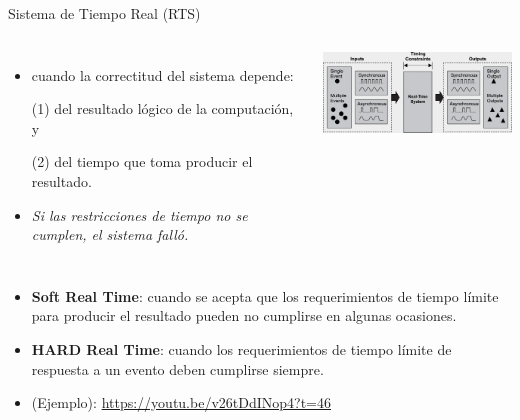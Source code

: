 \documentclass[8pt,aspectratio=169,compress]{beamer}
\begin{document}
\begin{frame}{Sistema de Tiempo Real (RTS)}

   \begin{columns}[onlytextwidth,T]
     \column{\dimexpr\linewidth-70mm-5mm}

	\begin{itemize}
\bigskip
  \item[RTS] cuando la correctitud del sistema depende:

\bigskip
(1) del resultado lógico de la computación, y

\bigskip
(2) del tiempo que toma producir el resultado.

\bigskip
  \item[FALLO] \textit{Si las restricciones de tiempo no se cumplen, el sistema falló.}

\bigskip

	\end{itemize}

      \column{70mm}
    \includegraphics[width=70mm]{images/rts.jpg}

    \end{columns}
\bigskip
\begin{itemize}
\item \textbf{Soft Real Time}: cuando se acepta que los requerimientos de tiempo límite para producir el resultado pueden no cumplirse en algunas ocasiones.
\bigskip
\item \textbf{HARD Real Time}: cuando los requerimientos de tiempo límite de respuesta a un evento deben cumplirse siempre.
\bigskip
 \item[Manipulador] (Ejemplo): {\small \url{https://youtu.be/v26tDdINop4?t=46}}
\end{itemize}
\end{frame}
\end{document}
